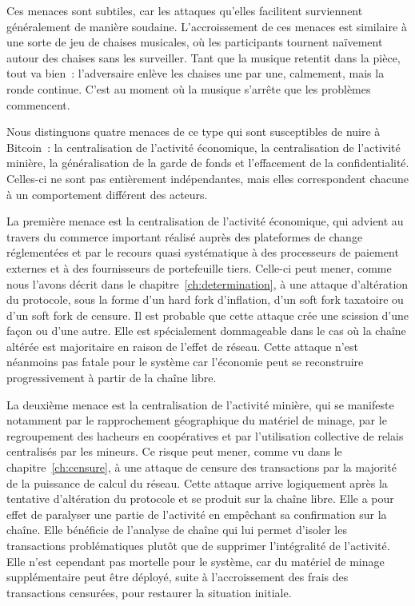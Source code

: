 Ces menaces sont subtiles, car les attaques qu'elles facilitent surviennent généralement de manière soudaine. L'accroissement de ces menaces est similaire à une sorte de jeu de chaises musicales, où les participants tournent naïvement autour des chaises sans les surveiller. Tant que la musique retentit dans la pièce, tout va bien~: l'adversaire enlève les chaises une par une, calmement, mais la ronde continue. C'est au moment où la musique s'arrête que les problèmes commencent.

Nous distinguons quatre menaces de ce type qui sont susceptibles de nuire à Bitcoin~: la centralisation de l'activité économique, la centralisation de l'activité minière, la généralisation de la garde de fonds et l'effacement de la confidentialité. Celles-ci ne sont pas entièrement indépendantes, mais elles correspondent chacune à un comportement différent des acteurs.

La première menace est la centralisation de l'activité économique, qui advient au travers du commerce important réalisé auprès des plateformes de change réglementées et par le recours quasi systématique à des processeurs de paiement externes et à des fournisseurs de portefeuille tiers. Celle-ci peut mener, comme nous l'avons décrit dans le chapitre~\ref{ch:determination}, à une attaque d'altération du protocole, sous la forme d'un hard fork d'inflation, d'un soft fork taxatoire ou d'un soft fork de censure. Il est probable que cette attaque crée une scission d'une façon ou d'une autre. Elle est spécialement dommageable dans le cas où la chaîne altérée est majoritaire en raison de l'effet de réseau. Cette attaque n'est néanmoins pas fatale pour le système car l'économie peut se reconstruire progressivement à partir de la chaîne libre.

La deuxième menace est la centralisation de l'activité minière, qui se manifeste notamment par le rapprochement géographique du matériel de minage, par le regroupement des hacheurs en coopératives et par l'utilisation collective de relais centralisés par les mineurs. Ce risque peut mener, comme vu dans le chapitre~\ref{ch:censure}, à une attaque de censure des transactions par la majorité de la puissance de calcul du réseau. Cette attaque arrive logiquement après la tentative d'altération du protocole et se produit sur la chaîne libre. Elle a pour effet de paralyser une partie de l'activité en empêchant sa confirmation sur la chaîne. Elle bénéficie de l'analyse de chaîne qui lui permet d'isoler les transactions problématiques plutôt que de supprimer l'intégralité de l'activité. Elle n'est cependant pas mortelle pour le système, car du matériel de minage supplémentaire peut être déployé, suite à l'accroissement des frais des transactions censurées, pour restaurer la situation initiale. %

